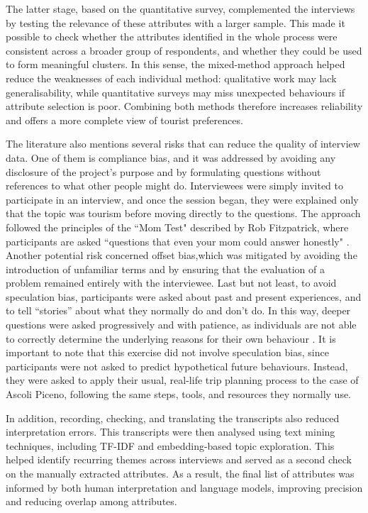 \documentclass[a4paper, 12pt, twoside]{report}  %
\begin{document}
\indent The latter stage, based on the quantitative survey, complemented the interviews by testing the relevance of these attributes with a larger sample. This made it possible to check whether the attributes identified in the whole process were consistent across a broader group of respondents, and whether they could be used to form meaningful clusters. In this sense, the mixed-method approach helped reduce the weaknesses of each individual method: qualitative work may lack generalisability, while quantitative surveys may miss unexpected behaviours if attribute selection is poor. Combining both methods therefore increases reliability and offers a more complete view of tourist preferences.

\indent The literature also mentions several risks that can reduce the quality of interview data. One of them is compliance bias, and it was addressed by avoiding any disclosure of the project’s purpose and by formulating questions without references to what other people might do. Interviewees were simply invited to participate in an interview, and once the session began, they were explained only that the topic was tourism before moving directly to the questions. The approach followed the principles of the ``Mom Test" described by Rob Fitzpatrick, where participants are asked ``questions that even your mom could answer honestly" \cite{massimo}. Another potential risk concerned offset bias,which was mitigated by avoiding the introduction of unfamiliar terms and by ensuring that the evaluation of a problem remained entirely with the interviewee. Last but not least, to avoid speculation bias, participants were asked about past and present experiences, and to tell ``stories” about what they normally do and don’t do. In this way, deeper questions were asked progressively and with patience, as individuals are not able to correctly determine the underlying reasons for their own behaviour \cite{massimo}. It is important to note that this exercise did not involve speculation bias, since participants were not asked to predict hypothetical future behaviours. Instead, they were asked to apply their usual, real-life trip planning process to the case of Ascoli Piceno, following the same steps, tools, and resources they normally use.

\indent In addition, recording, checking, and translating the transcripts also reduced interpretation errors. This transcripts were then analysed using text mining techniques, including TF-IDF and embedding-based topic exploration. This helped identify recurring themes across interviews and served as a second check on the manually extracted attributes. As a result, the final list of attributes was informed by both human interpretation and language models, improving precision and reducing overlap among attributes.
\end{document}
